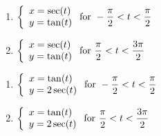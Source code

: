 \documentclass{ximera}
\begin{document}
\begin{multicols}{2} \raggedcolumns 
\begin{enumerate}
\setcounter{enumi}{\value{HW}}

\item ${\displaystyle \left\{ \begin{array}{l} x = \sec(t) \\ y = \tan(t) \end{array} \right. \vspace{.25in} \mbox{for } -\dfrac{\pi}{2} < t < \dfrac{\pi}{2}}$
\item ${\displaystyle \left\{ \begin{array}{l} x = \sec(t) \\ y = \tan(t) \end{array} \right. \vspace{.25in} \mbox{for } \dfrac{\pi}{2} < t < \dfrac{3\pi}{2}}$

\setcounter{HW}{\value{enumi}}
\end{enumerate}
\end{multicols}

\begin{multicols}{2} \raggedcolumns 
\begin{enumerate}
\setcounter{enumi}{\value{HW}}

\item ${\displaystyle \left\{ \begin{array}{l} x = \tan(t) \\ y = 2\sec(t) \end{array} \right. \vspace{.25in} \mbox{for } -\dfrac{\pi}{2} < t < \dfrac{\pi}{2}}$
\item ${\displaystyle \left\{ \begin{array}{l} x = \tan(t) \\ y = 2\sec(t) \end{array} \right. \vspace{.25in} \mbox{for } \dfrac{\pi}{2} < t < \dfrac{3\pi}{2}}$

\setcounter{HW}{\value{enumi}}
\end{enumerate}
\end{multicols}
\end{document}
